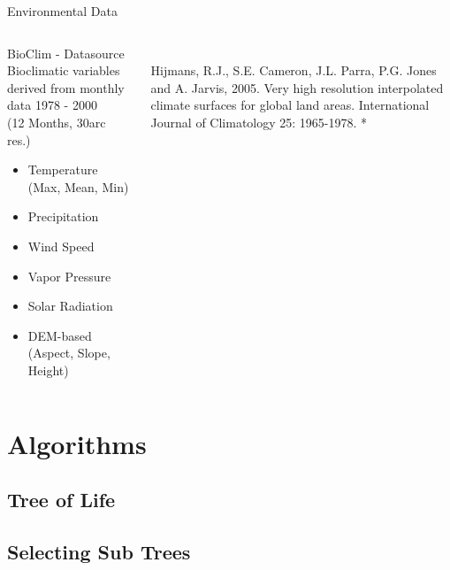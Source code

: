 \documentclass{beamer}
\begin{document}
\begin{frame}{Environmental Data}
\begin{columns}
	\begin{column}{0.4\textwidth}
\begin{block}{BioClim - Datasource}
Bioclimatic variables derived from monthly data 1978 -  2000 \\(12 Months, 30arc res.)
\begin{itemize}
	\item Temperature (Max, Mean, Min)
	\item Precipitation
	\item Wind Speed
	\item Vapor Pressure
	\item Solar Radiation
	\item DEM-based (Aspect, Slope, Height)
\end{itemize}
	\end{block}		
	\end{column}
	\begin{column}{0.6\textwidth}
			\centering
			\centering
{}
{\tiny \\ Hijmans, R.J., S.E. Cameron, J.L. Parra, P.G. Jones and A. Jarvis, 2005. Very high resolution interpolated climate surfaces for global land areas. International Journal of Climatology 25: 1965-1978. * }
\end{column}    	    
		\end{columns}	
\end{frame}

\section{Algorithms}
\begin{frame}
\begin{block}

\end{block}
\end{frame}
\subsection{Tree of Life}
\begin{frame}
\begin{block}

\end{block}
\end{frame}
\subsection{Selecting Sub Trees}
\begin{frame}
\begin{block}

\end{block}
\end{frame}
\end{document}
